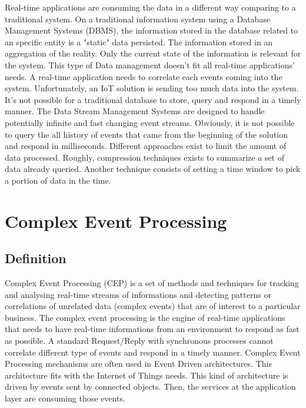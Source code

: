 \documentclass[11pt]{article}
\begin{document}
Real-time applications are consuming the data in a different way comparing to a traditional system. On a traditional information system using a Database Management Systems (DBMS), the information stored in the database related to an specific entity is a "static" data persisted. The information stored in an aggregation of the reality. Only the current state of the information is relevant for the system. This type of Data management doesn't fit all real-time applications' needs. A real-time application needs to correlate each events coming into the system. Unfortunately, an IoT solution is sending too much data into the system. It's not possible for a traditional database to store, query and respond in a timely manner. 
\newline
\newline
The Data Stream Management Systems are designed to handle potentially infinite and fast changing event streams. Obviously, it is not possible to query the all history of events that came from the beginning of the solution and respond in milliseconds. Different approaches exist to limit the amount of data processed. Roughly, compression techniques exists to summarize a set of data already queried. Another technique consists of setting a time window to pick a portion of data in the time.

\section{Complex Event Processing}

\subsection{Definition}

Complex Event Processing (CEP) is a set of methods and techniques for tracking
and analysing real-time streams of informations and detecting patterns or correlations
of unrelated data (complex events) that are of interest to a particular
business. \cite{1} The complex event processing is the engine of real-time applications that needs to have real-time informations from an environment to respond as fast as possible. A standard Request/Reply with synchronous processes cannot correlate different type of events and respond in a timely manner. Complex Event Processing mechanisms are often used in Event Driven architectures. This architecture fits with the Internet of Things needs. This kind of architecture is driven by events sent by connected objects. Then, the services at the application layer are consuming those events.
\end{document}
